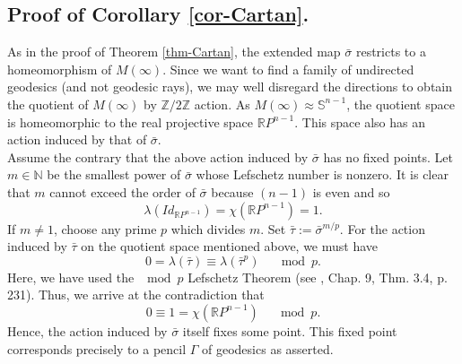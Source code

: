\documentclass[12pt,a4paper]{article}
\begin{document}
    \subsection{Proof of Corollary \ref{cor-Cartan}.}
\indent

    As in the proof of Theorem \ref{thm-Cartan}, the extended map $\bar{\sigma}$ restricts to a homeomorphism of $M(\infty)$. Since we want to find a family of undirected geodesics (and not geodesic rays), we may well disregard the directions to obtain the quotient of $M(\infty)$ by $\mathbb{Z}/2\mathbb{Z}$ action. As $M(\infty)\approx \mathbb{S}^{n-1} $, the quotient space is homeomorphic to the real projective space $\mathbb{R}P^{n-1}$. This space also has an action induced by that of $\bar{\sigma}$.\\

    Assume the contrary that the above action induced by $\bar{\sigma}$ has no fixed points. Let $m\in \mathbb{N}$ be the smallest power of $\bar{\sigma}$ whose Lefschetz number is nonzero. It is clear that $m$ cannot exceed the order of $\bar{\sigma}$ because $(n-1)$ is even and so
    \begin{equation*}
     \lambda(Id_{\mathbb{R}P^{n-1}})=\chi(\mathbb{R}P^{n-1})=1.
    \end{equation*}
    If $m\not = 1$, choose any prime $p$ which divides $m$. Set $\bar{\tau}:= \bar{\sigma}^{m/p}$. For the action induced by $\bar{\tau}$ on the quotient space mentioned above, we must have
    \begin{equation*}
     0=\lambda(\bar{\tau})\equiv \lambda(\bar{\tau}^{p}) \quad \mod p.
    \end{equation*}
    Here, we have used the $\mod p$ Lefschetz Theorem (see \cite{dugundji}, Chap. 9, Thm. 3.4, p. 231). Thus, we arrive at the contradiction that
    \begin{equation*}
                  0\equiv 1 =\chi(\mathbb{R}P^{n-1})\quad \mod p .                                                                                                                                                                                                                         \end{equation*}
  Hence, the action induced by $\bar{\sigma}$ itself fixes some point. This fixed point corresponds precisely to a pencil $\Gamma$ of geodesics as asserted.
\end{document}
